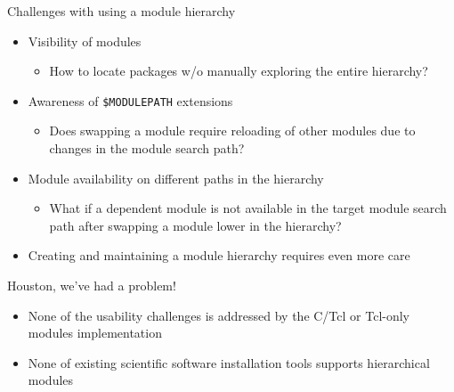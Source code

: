 \documentclass[10pt,xcolor={usenames,dvipsnames}]{beamer}
\begin{document}
\begin{frame}{Challenges with using a module hierarchy}
\begin{itemize}
    \item
        Visibility of modules
        \begin{itemize}
            \item
                How to locate packages w/o manually exploring the entire
                hierarchy?
        \end{itemize}
    \item
        Awareness of \texttt{\$MODULEPATH} extensions
        \begin{itemize}
            \item
                Does swapping a module require reloading of other modules due
                to changes in the module search path?
        \end{itemize}
    \item
        Module availability on different paths in the hierarchy
        \begin{itemize}
            \item
                What if a dependent module is not available in the target
                module search path after swapping a module lower in the
                hierarchy?
        \end{itemize}
    \item
        Creating and maintaining a module hierarchy requires even more care
\end{itemize}
\begin{center}
    \begin{minipage}{0.9\textwidth}
        \begin{alertblock}{Houston, we've had a problem!}
            \footnotesize
            \begin{itemize}
                \item
                    None of the usability challenges is addressed by the
                    C/Tcl or Tcl-only modules implementation
                \item
                    None of existing scientific software installation tools
                    supports hierarchical modules
            \end{itemize}
        \end{alertblock}
    \end{minipage}
\end{center}
\end{frame}
\end{document}
